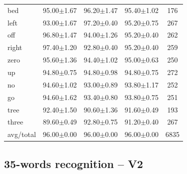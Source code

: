 \documentclass{beamer}
\begin{document}
{\begin{table}[h!]
\begin{tabular}{lcccc}
		bed       &  95.00$\pm$1.67 &  96.20$\pm$1.47 &  95.40$\pm$1.02 &     176 \\
		left      &  93.00$\pm$1.67 &  97.20$\pm$0.40 &  95.20$\pm$0.75 &     267 \\
		off       &  96.80$\pm$1.47 &  94.00$\pm$1.26 &  95.20$\pm$0.40 &     262 \\
		right     &  97.40$\pm$1.20 &  92.80$\pm$0.40 &  95.20$\pm$0.40 &     259 \\
		zero      &  95.60$\pm$1.36 &  94.40$\pm$1.02 &  95.00$\pm$0.63 &     250 \\
		up        &  94.80$\pm$0.75 &  94.80$\pm$0.98 &  94.80$\pm$0.75 &     272 \\
		no        &  94.60$\pm$1.02 &  93.00$\pm$0.89 &  93.80$\pm$1.17 &     252 \\
		go        &  94.60$\pm$1.62 &  93.40$\pm$0.80 &  93.80$\pm$0.75 &     251 \\
		tree      &  92.40$\pm$1.50 &  90.60$\pm$1.36 &  91.60$\pm$0.49 &     193 \\
		three     &  89.60$\pm$0.49 &  92.80$\pm$0.75 &  91.20$\pm$0.40 &     267 \\
		\midrule avg/total &  96.00$\pm$0.00 &  96.00$\pm$0.00 &  96.00$\pm$0.00 &    6835 \\
		\bottomrule
	\end{tabular}

\end{table}
}

\subsection{35-words recognition – V2}
\end{document}
